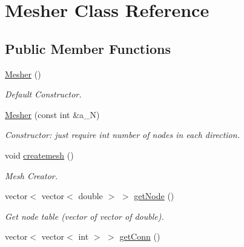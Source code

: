 \hypertarget{classMesher}{
\section{Mesher Class Reference}
\label{classMesher}
}
\subsection*{Public Member Functions}
\begin{DoxyCompactItemize}
\item 
\hypertarget{classMesher_a1d69a9028407d910b655ae908eed0b12}{
\hyperlink{classMesher_a1d69a9028407d910b655ae908eed0b12}{Mesher} ()}
\label{classMesher_a1d69a9028407d910b655ae908eed0b12}

\begin{DoxyCompactList}\small\item\em Default Constructor. \item\end{DoxyCompactList}\item 
\hypertarget{classMesher_a88f5c6077fbbe90544f305cb8386e786}{
\hyperlink{classMesher_a88f5c6077fbbe90544f305cb8386e786}{Mesher} (const int \&a\_\-N)}
\label{classMesher_a88f5c6077fbbe90544f305cb8386e786}

\begin{DoxyCompactList}\small\item\em Constructor: just require int number of nodes in each direction. \item\end{DoxyCompactList}\item 
\hypertarget{classMesher_ac21a01625bf0529885b8b02a9cf14a09}{
void \hyperlink{classMesher_ac21a01625bf0529885b8b02a9cf14a09}{createmesh} ()}
\label{classMesher_ac21a01625bf0529885b8b02a9cf14a09}

\begin{DoxyCompactList}\small\item\em Mesh Creator. \item\end{DoxyCompactList}\item 
\hypertarget{classMesher_a209b5aab9168cbd9e2fbf9952caebeae}{
vector$<$ vector$<$ double $>$ $>$ \hyperlink{classMesher_a209b5aab9168cbd9e2fbf9952caebeae}{getNode} ()}
\label{classMesher_a209b5aab9168cbd9e2fbf9952caebeae}

\begin{DoxyCompactList}\small\item\em Get node table (vector of vector of double). \item\end{DoxyCompactList}\item 
\hypertarget{classMesher_af380d9de5e852c7ed1b1fe91d22f1fab}{
vector$<$ vector$<$ int $>$ $>$ \hyperlink{classMesher_af380d9de5e852c7ed1b1fe91d22f1fab}{getConn} ()}
\label{classMesher_af380d9de5e852c7ed1b1fe91d22f1fab}


\end{DoxyCompactItemize}
